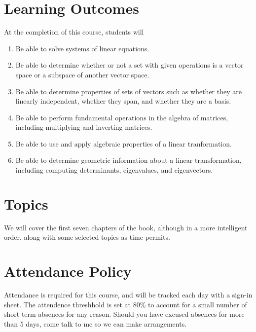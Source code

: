 \documentclass[letterpaper]{article}
\begin{document}
\section*{\fontsize{12}{15}\selectfont Learning Outcomes}
At the completion of this course, students will
\begin{enumerate}[1)]
\item Be able to solve systems of linear equations.
\item Be able to determine whether or not a set with given operations is a vector space or a subspace of another vector space.
\item Be able to determine properties of sets of vectors such as whether they are linearly independent, whether they span, and whether they are a basis.
\item Be able to perform fundamental operations in the algebra of matrices, including multiplying and inverting matrices.
\item Be able to use and apply algebraic properties of a linear tranformation.
\item Be able to determine geometric information about a linear transformation, including computing determinants, eigenvalues, and eigenvectors.
\end{enumerate}

\section*{\fontsize{12}{15}\selectfont Topics}
We will cover the first seven chapters of the book, although in a more intelligent order, along with some selected topics as time permits.


\section*{\fontsize{12}{15}\selectfont Attendance Policy}
Attendance is required for this course, and will be tracked each day with a sign-in sheet.  The attendence threshhold is set at 80\% to account for a small number of short term absences for any reason.  Should you have excused absences for more than 5 days, come talk to me so we can make arrangements.
\end{document}
